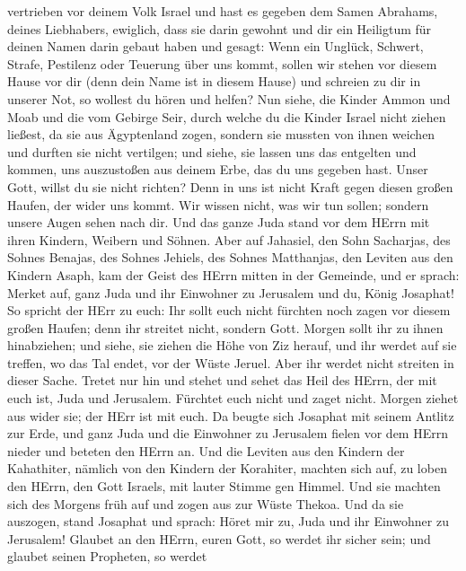 vertrieben vor deinem Volk Israel und hast es gegeben dem Samen
Abrahams, deines Liebhabers, ewiglich,  dass sie darin
gewohnt und dir ein Heiligtum für deinen Namen darin gebaut haben und
gesagt:  Wenn ein Unglück, Schwert, Strafe, Pestilenz oder
Teuerung über uns kommt, sollen wir stehen vor diesem Hause vor dir
(denn dein Name ist in diesem Hause) und schreien zu dir in unserer Not,
so wollest du hören und helfen?  Nun siehe, die Kinder
Ammon und Moab und die vom Gebirge Seir, durch welche du die Kinder
Israel nicht ziehen ließest, da sie aus Ägyptenland zogen, sondern sie
mussten von ihnen weichen und durften sie nicht vertilgen; 
und siehe, sie lassen uns das entgelten und kommen, uns auszustoßen aus
deinem Erbe, das du uns gegeben hast.  Unser Gott, willst
du sie nicht richten? Denn in uns ist nicht Kraft gegen diesen großen
Haufen, der wider uns kommt. Wir wissen nicht, was wir tun sollen;
sondern unsere Augen sehen nach dir.  Und das ganze Juda
stand vor dem HErrn mit ihren Kindern, Weibern und Söhnen. 
Aber auf Jahasiel, den Sohn Sacharjas, des Sohnes Benajas, des Sohnes
Jehiels, des Sohnes Matthanjas, den Leviten aus den Kindern Asaph, kam
der Geist des HErrn mitten in der Gemeinde,  und er sprach:
Merket auf, ganz Juda und ihr Einwohner zu Jerusalem und du, König
Josaphat! So spricht der HErr zu euch: Ihr sollt euch nicht fürchten
noch zagen vor diesem großen Haufen; denn ihr streitet nicht, sondern
Gott.  Morgen sollt ihr zu ihnen hinabziehen; und siehe,
sie ziehen die Höhe von Ziz herauf, und ihr werdet auf sie treffen, wo
das Tal endet, vor der Wüste Jeruel.  Aber ihr werdet nicht
streiten in dieser Sache. Tretet nur hin und stehet und sehet das Heil
des HErrn, der mit euch ist, Juda und Jerusalem. Fürchtet euch nicht und
zaget nicht. Morgen ziehet aus wider sie; der HErr ist mit euch.
 Da beugte sich Josaphat mit seinem Antlitz zur Erde, und
ganz Juda und die Einwohner zu Jerusalem fielen vor dem HErrn nieder und
beteten den HErrn an.  Und die Leviten aus den Kindern der
Kahathiter, nämlich von den Kindern der Korahiter, machten sich auf, zu
loben den HErrn, den Gott Israels, mit lauter Stimme gen Himmel.
 Und sie machten sich des Morgens früh auf und zogen aus
zur Wüste Thekoa. Und da sie auszogen, stand Josaphat und sprach: Höret
mir zu, Juda und ihr Einwohner zu Jerusalem! Glaubet an den HErrn, euren
Gott, so werdet ihr sicher sein; und glaubet seinen Propheten, so werdet
